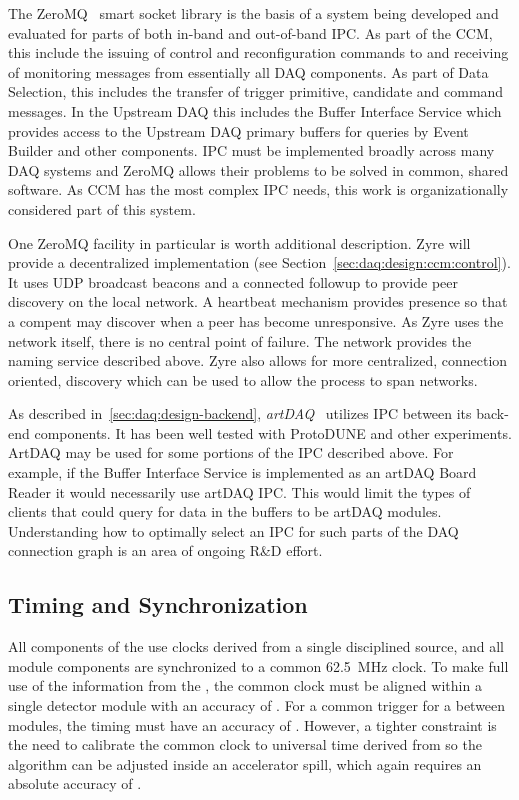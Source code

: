 The ZeroMQ~\cite{zeromq} smart socket library is the basis of a system being
developed and evaluated for parts of both in-band and out-of-band IPC. 
As part of the CCM, this include the issuing of control and reconfiguration
commands to and receiving of monitoring messages from essentially all DAQ
components. 
As part of Data Selection, this includes the transfer of trigger primitive,
candidate and command messages. 
In the Upstream DAQ this includes the Buffer Interface Service which provides
access to the Upstream DAQ primary buffers for queries by Event Builder and
other components. 
IPC must be implemented broadly across many DAQ systems and ZeroMQ allows their
problems to be solved in common, shared software. 
As CCM has the most complex IPC needs, this work is organizationally considered
part of this system.

One ZeroMQ facility in particular is worth additional description. 
Zyre will provide a decentralized implementation  (see
Section~\ref{sec:daq:design:ccm:control}). 
It uses UDP broadcast beacons and a connected followup to provide peer discovery
on the local network. 
A heartbeat mechanism provides presence so that a compent may discover when a
peer has become unresponsive.  
As Zyre uses the network itself, there is no central point of failure. 
The network provides the naming service described above. 
Zyre also allows for more centralized, connection oriented, discovery which can
be used to allow the process to span networks.

As described in~\ref{sec:daq:design-backend}, \textit{artDAQ}~\cite{artdaq}
utilizes IPC between its back-end components. 
It has been well tested with ProtoDUNE and other experiments. 
ArtDAQ may be used for some portions of the IPC described above. 
For example, if the Buffer Interface Service is implemented as an artDAQ Board
Reader it would necessarily use artDAQ IPC. 
This would limit the types of clients that could query for data in the buffers
to be artDAQ modules. 
Understanding how to optimally select an IPC for such parts of the DAQ
connection graph is an area of ongoing R\&D effort.

\subsection{Timing and Synchronization}
\label{sec:daq:design-timing}

All components of the  use clocks derived from a single 
disciplined source, and all module components are synchronized to a common
\SI{62.5}{MHz} clock. 
To make full use of the information from the , the common clock must
be aligned within a single detector module with an accuracy of
. 
For a common trigger for a  between modules, the timing must have an
accuracy of .
However, a tighter constraint is the need to calibrate the common clock to
universal time derived from  so the  algorithm can be
adjusted inside an accelerator spill, which again requires an absolute accuracy
of .

